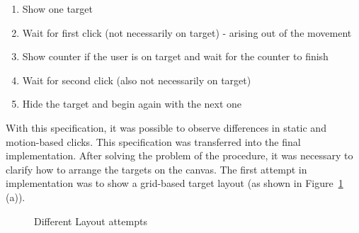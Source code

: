 \newpage

\begin{enumerate}
    \item Show one target
    \item Wait for first click (not necessarily on target) - arising out of the movement
    \item Show counter if the user is on target and wait for the counter to finish
    \item Wait for second click (also not necessarily on target)
    \item Hide the target and begin again with the next one
\end{enumerate}

With this specification, it was possible to observe differences in static and motion-based clicks. This specification was transferred into the final implementation.
\newline
\newline
After solving the problem of the procedure, it was necessary to clarify how to arrange the targets on the canvas. The first attempt in implementation was to show a grid-based target layout (as shown in Figure~\ref{fig:layout-attempts} (a)).

\begin{figure}[h]
    \centering
    \qquad
    \caption{Different Layout attempts}
    \label{fig:layout-attempts}
\end{figure}

